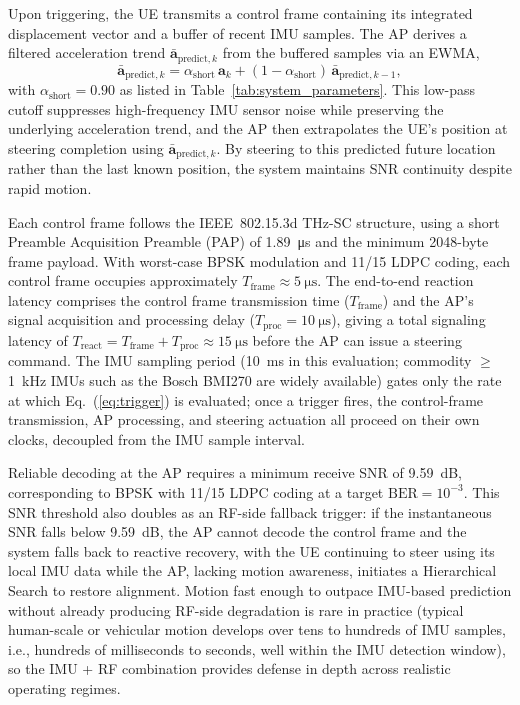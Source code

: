 \documentclass[fleqn,10pt]{wlscirep}
\newcommand{\rev}[1]{{\color{revblue}#1}}
\begin{document}
Upon triggering, the UE transmits a control frame containing its integrated displacement vector and a buffer of recent IMU samples. \rev{The AP derives a filtered acceleration trend $\bar{\mathbf{a}}_{\text{predict},k}$ from the buffered samples via an EWMA,
\begin{equation}
    \bar{\mathbf{a}}_{\text{predict},k} = \alpha_{\text{short}}\, \mathbf{a}_k + (1 - \alpha_{\text{short}})\, \bar{\mathbf{a}}_{\text{predict},k-1},
    \label{eq:ewma_predict}
\end{equation}
with $\alpha_{\text{short}} = 0.90$ as listed in Table~\ref{tab:system_parameters}. This low-pass cutoff suppresses high-frequency IMU sensor noise while preserving the underlying acceleration trend, and the AP then extrapolates the UE's position at steering completion using $\bar{\mathbf{a}}_{\text{predict},k}$.} By steering to this predicted future location rather than the last known position, the system maintains SNR continuity despite rapid motion.

Each control frame follows the IEEE~802.15.3d THz-SC structure\cite{9269931}, using a short Preamble Acquisition Preamble (PAP) of \SI{1.89}{\micro\second} and the minimum 2048-byte frame payload. With worst-case BPSK modulation and 11/15 LDPC coding, each control frame occupies approximately $T_{\text{frame}} \approx \SI{5}{\micro\second}$. The end-to-end reaction latency comprises the control frame transmission time ($T_{\text{frame}}$) and the AP's signal acquisition and processing delay ($T_{\text{proc}} = \SI{10}{\micro\second}$), giving a total signaling latency of $T_{\text{react}} = T_{\text{frame}} + T_{\text{proc}} \approx \SI{15}{\micro\second}$ before the AP can issue a steering command. \rev{The IMU sampling period (\SI{10}{\milli\second} in this evaluation; commodity $\geq$\SI{1}{\kilo\hertz} IMUs such as the Bosch BMI270 are widely available) gates only the rate at which Eq.~(\ref{eq:trigger}) is evaluated; once a trigger fires, the control-frame transmission, AP processing, and steering actuation all proceed on their own clocks, decoupled from the IMU sample interval.}

Reliable decoding at the AP requires a minimum receive SNR of \SI{9.59}{\deci\bel}, corresponding to BPSK with 11/15 LDPC coding at a target $\text{BER} = 10^{-3}$. \rev{This SNR threshold also doubles as an RF-side fallback trigger:} if the instantaneous SNR falls below \SI{9.59}{\deci\bel}, the AP cannot decode the control frame and the system falls back to reactive recovery, with the UE continuing to steer using its local IMU data while the AP, lacking motion awareness, initiates a Hierarchical Search to restore alignment. \rev{Motion fast enough to outpace IMU-based prediction without already producing RF-side degradation is rare in practice (typical human-scale or vehicular motion develops over tens to hundreds of IMU samples, i.e., hundreds of milliseconds to seconds, well within the IMU detection window), so the IMU + RF combination provides defense in depth across realistic operating regimes.}
\end{document}
